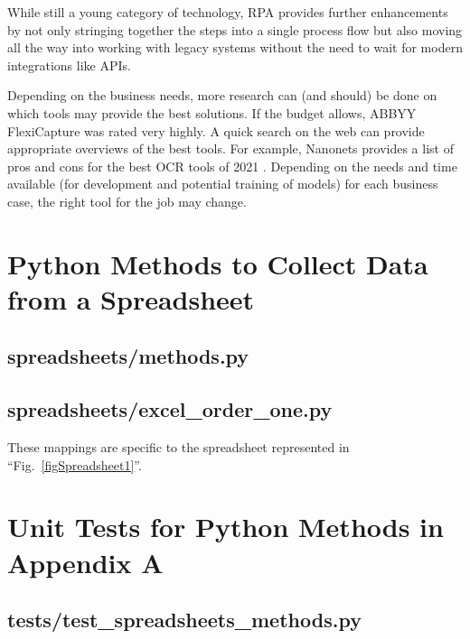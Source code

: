\documentclass[conference]{IEEEtran}
\begin{document}
While still a young category of technology, RPA provides further enhancements by not only stringing together the steps into a single process flow but also moving all the way into working with legacy systems without the need to wait for modern integrations like APIs.

Depending on the business needs, more research can (and should) be done on which tools may provide the best solutions. If the budget allows, ABBYY FlexiCapture was rated very highly. A quick search on the web can provide appropriate overviews of the best tools. For example, Nanonets provides a list of pros and cons for the best OCR tools of 2021 \cite{prithiv2021best}. Depending on the needs and time available (for development and potential training of models) for each business case, the right tool for the job may change.




\onecolumn
\appendices

\newpage
\section{Python Methods to Collect Data from a Spreadsheet} \label{appendixOrderOne}
    \subsection{spreadsheets/methods.py}
    

    \newpage
    \subsection{spreadsheets/excel\_order\_one.py}
    These mappings are specific to the spreadsheet represented in ``Fig.~\ref{figSpreadsheet1}''.
    

\newpage
\section{Unit Tests for Python Methods in Appendix A} \label{appendixOrderOneTests}
    \subsection{tests/test\_spreadsheets\_methods.py}
    
\end{document}
